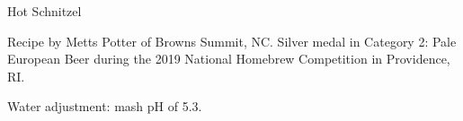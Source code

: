 \begin{recipe}{Hot Schnitzel}

\begin{aboutblock}
Recipe by Metts Potter of Browns Summit, NC. Silver medal in Category 2: Pale
European Beer during the 2019 National Homebrew Competition in Providence, RI.
\sourceaha
\end{aboutblock}


\begin{methodandtiming}
 
\begin{mashsteps}
\end{mashsteps}

\begin{fermentationsteps}
\end{fermentationsteps}

\begin{directions}
Water adjustment: mash pH of 5.3.
\end{directions}

\end{methodandtiming}

\recipebreak

\begin{ingredientsblock}

\begin{malts}
\end{malts}

\begin{hops}
\end{hops}


\end{ingredientsblock}

\end{recipe}

